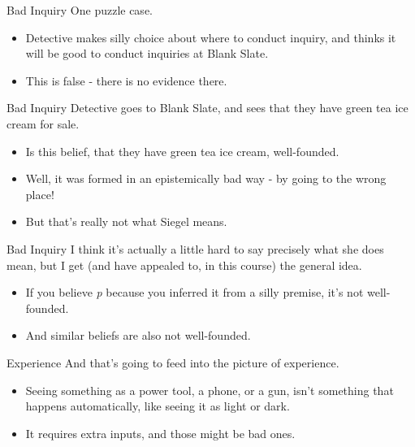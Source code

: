\documentclass[
  17pt,
  letterpaper,
  ignorenonframetext,
  aspectratio=169,
  handout,
  xcolor={dvipsnames}]{beamer}
\providecommand{\tightlist}{%
  \setlength{\itemsep}{0pt}\setlength{\parskip}{0pt}}\usepackage{longtable,booktabs,array}
\begin{document}
\begin{frame}{Bad Inquiry}
\protect\hypertarget{bad-inquiry}{}
One puzzle case.

\begin{itemize}[<+->]
\tightlist
\item
  Detective makes silly choice about where to conduct inquiry, and
  thinks it will be good to conduct inquiries at Blank Slate.
\item
  This is false - there is no evidence there.
\end{itemize}
\end{frame}

\begin{frame}{Bad Inquiry}
\protect\hypertarget{bad-inquiry-1}{}
Detective goes to Blank Slate, and sees that they have green tea ice
cream for sale.

\begin{itemize}[<+->]
\tightlist
\item
  Is this belief, that they have green tea ice cream, well-founded.
\item
  Well, it was formed in an epistemically bad way - by going to the
  wrong place!
\item
  But that's really not what Siegel means.
\end{itemize}
\end{frame}

\begin{frame}{Bad Inquiry}
\protect\hypertarget{bad-inquiry-2}{}
I think it's actually a little hard to say precisely what she does mean,
but I get (and have appealed to, in this course) the general idea.

\begin{itemize}[<+->]
\tightlist
\item
  If you believe \emph{p} because you inferred it from a silly premise,
  it's not well-founded.
\item
  And similar beliefs are also not well-founded.
\end{itemize}
\end{frame}

\begin{frame}{Experience}
\protect\hypertarget{experience-1}{}
And that's going to feed into the picture of experience.

\begin{itemize}[<+->]
\tightlist
\item
  Seeing something as a power tool, a phone, or a gun, isn't something
  that happens automatically, like seeing it as light or dark.
\item
  It requires extra inputs, and those might be bad ones.
\end{itemize}
\end{frame}
\end{document}
